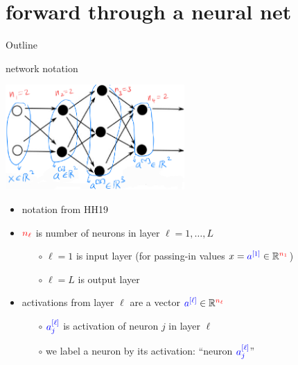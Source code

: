 \documentclass[xcolor={svgnames},
               hyperref={colorlinks,citecolor=DeepPink4,linkcolor=FireBrick,urlcolor=Maroon}]
               {beamer}
\newcommand{\RR}{\mathbb{R}}
\begin{document}
\section{forward through a neural net}

\begin{frame}{Outline}
\end{frame}

\begin{frame}{network notation}

\begin{center}
\includegraphics[height=40mm]{figs/state-notation}
\end{center}

\begin{itemize}
\item notation from HH19
\item ${\color{red} n_\ell}$ is number of neurons in layer $\ell=1,\dots,L$
    \begin{itemize}
    \item[$\circ$] $\ell=1$ is \alert{input} layer (for passing-in values $x = {\color{blue} a^{[1]}} \in \RR^{{\color{red} n_1}}$)
    \item[$\circ$] $\ell=L$ is \alert{output} layer
    \end{itemize}
\item activations from layer $\ell$ are a vector ${\color{blue} a^{[\ell]}} \in \RR^{{\color{red} n_\ell}}$
    \begin{itemize}
    \item[$\circ$] ${\color{blue} a_j^{[\ell]}}$ is activation of neuron $j$ in layer $\ell$
    \item[$\circ$] we label a neuron by its activation: ``neuron ${\color{blue} a_j^{[\ell]}}$''
    \end{itemize}
\end{itemize}
\end{frame}
\end{document}
